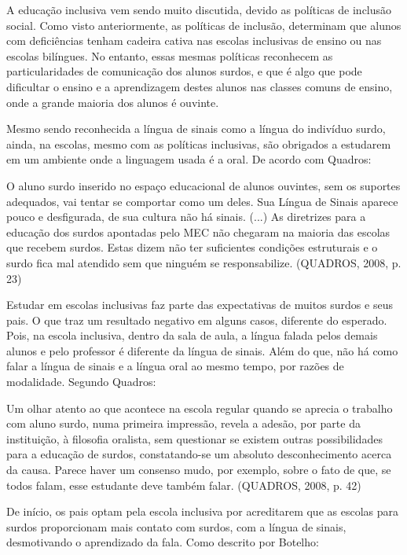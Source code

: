 \documentclass[brasil]{abnt}
\begin{document}
	A educação inclusiva vem sendo muito discutida, devido as políticas de inclusão social. Como visto anteriormente, as políticas de inclusão, determinam que alunos com deficiências tenham cadeira cativa 
	nas escolas inclusivas de ensino ou nas escolas bilíngues. No entanto, essas mesmas políticas reconhecem as particularidades de comunicação dos alunos surdos, e que é algo que pode dificultar o ensino e 
	a aprendizagem destes alunos nas classes comuns de ensino, onde a grande maioria dos alunos é ouvinte.
	
	Mesmo sendo reconhecida a língua de sinais como a língua do indivíduo surdo, ainda, na escolas, mesmo com as políticas inclusivas, são obrigados a estudarem em um ambiente onde
	a linguagem usada é a oral. De acordo com Quadros:
					
		\begin{citacao}O aluno surdo inserido no espaço educacional de alunos ouvintes, sem os suportes adequados, vai tentar se comportar como um deles. Sua Língua de Sinais aparece pouco e desfigurada, 
						de sua cultura não há sinais. (...) As diretrizes para a educação dos surdos apontadas pelo MEC não chegaram na maioria das escolas que recebem surdos. Estas dizem não ter suficientes 
						condições estruturais e o surdo fica mal atendido sem que ninguém se responsabilize. (QUADROS, 2008, p. 23)
		\end{citacao}
		
	Estudar em escolas inclusivas faz parte das expectativas de muitos surdos e seus pais. O que traz um resultado negativo em alguns casos, diferente do esperado.
	Pois, na escola inclusiva, dentro da sala de aula, a língua falada pelos demais alunos e pelo professor é diferente da língua de sinais. Além do que, não há como falar
	a língua de sinais e a língua oral ao mesmo tempo, por razões de modalidade. Segundo Quadros:
	
		\begin{citacao} Um olhar atento ao que acontece na escola regular quando se aprecia o trabalho com aluno surdo, numa primeira impressão, revela a adesão, por parte
						da instituição, à filosofia oralista, sem questionar se existem outras possibilidades para a educação de surdos, constatando-se um absoluto 
						desconhecimento acerca da causa. Parece haver um consenso mudo, por exemplo, sobre o fato de que, se todos falam, esse estudante deve também falar.
						(QUADROS, 2008, p. 42)
		\end{citacao}
	
	De início, os pais optam pela escola inclusiva por acreditarem que as escolas para surdos proporcionam mais contato com surdos, com a língua de sinais, desmotivando o
	aprendizado da fala. Como descrito por Botelho:
	
\end{document}
